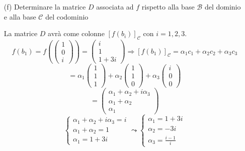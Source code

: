 \documentclass[a4paper]{article}
\theoremstyle{break}
\theoremstyle{break}
\theoremstyle{break}
\theoremstyle{break}
\begin{document}
\begin{enumerate}
	\item[(f)] Determinare la matrice \( D \) associata ad \( f \) rispetto alla base
	      \( \mathcal{B} \) del dominio e alla base \( \mathcal{C} \) del codominio

	      \vspace{1em}
	      La matrice \( D \) avrà come colonne \( [f(b_i)]_{\mathcal{C}} \) con \( i = 1, 2, 3 \).
	      \[
		      f(b_1) = f \left( \begin{pmatrix} 1 \\ 0 \\ i \end{pmatrix} \right)
		      = \begin{pmatrix} i \\ 1 \\ 1+3i \end{pmatrix}
		      \Rightarrow
		      [f(b_1)]_{\mathcal{C}} = \alpha_1 c_1 + \alpha_2 c_2 + \alpha_3 c_3
	      \]
	      \[
		      = \alpha_1 \begin{pmatrix} 1 \\ 1 \\ 1 \end{pmatrix} + \alpha_2 \begin{pmatrix} 1 \\ 1 \\ 0 \end{pmatrix} + \alpha_3 \begin{pmatrix} i \\ 0 \\ 0 \end{pmatrix}
	      \]
	      \[
		      = \begin{pmatrix}
			      \alpha_1 + \alpha_2 + i\alpha_3 \\
			      \alpha_1 + \alpha_2             \\
			      \alpha_1
		      \end{pmatrix}
	      \]
	      \[
		      \begin{cases}
			      \alpha_1 + \alpha_2 + i\alpha_3 = i \\
			      \alpha_1 + \alpha_2 = 1             \\
			      \alpha_1 = 1+3i
		      \end{cases}
		      \leadsto
		      \begin{cases}
			      \alpha_1 = 1+3i \\
			      \alpha_2 = -3i  \\
			      \alpha_3 = \frac{i-1}{i}
		      \end{cases}
	      \]


\end{enumerate}
\end{document}
